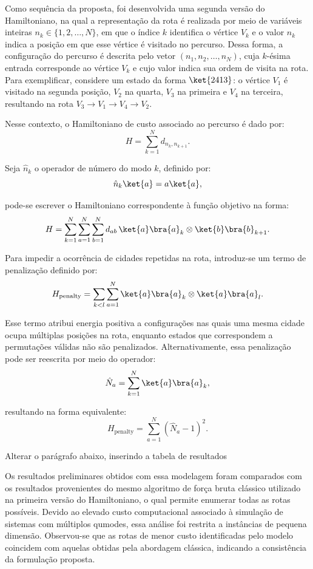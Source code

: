     Como sequência da proposta, foi desenvolvida uma segunda versão do Hamiltoniano, na qual a representação da rota é realizada por meio de variáveis inteiras $n_k \in \{1,2,\dots,N\}$, em que o índice $k$ identifica o vértice $V_k$ e o valor $n_k$ indica a posição em que esse vértice é visitado no percurso. Dessa forma, a configuração do percurso é descrita pelo vetor $(n_1, n_2, \dots, n_N)$, cuja $k$-ésima entrada corresponde ao vértice $V_k$ e cujo valor indica sua ordem de visita na rota. Para exemplificar, considere um estado da forma $\ket{2413}$: o vértice $V_1$ é visitado na segunda posição, $V_2$ na quarta, $V_3$ na primeira e $V_4$ na terceira, resultando na rota $V_3\rightarrow V_1\rightarrow V_4\rightarrow V_2$.

    Nesse contexto, o Hamiltoniano de custo associado ao percurso é dado por:
    $$
    H = \sum_{k=1}^N d_{n_k, n_{k+1}}.
    $$

    Seja $\hat{n}_k$ o operador de número do modo $k$, definido por:
    $$
    \hat{n}_k\ket{a} = a\ket{a},
    $$

    \noindent pode-se escrever o Hamiltoniano correspondente à função objetivo na forma:
    $$
    H = \sum_{k=1}^N \sum_{a=1}^N \sum_{b=1}^N d_{ab}\, \ket{a}\bra{a}_k \otimes \ket{b}\bra{b}_{k+1}.
    $$

    Para impedir a ocorrência de cidades repetidas na rota, introduz-se um termo de penalização definido por:
    $$
    H_{\text{penalty}} = \sum_{k<l} \sum_{a=1}^N \ket{a}\bra{a}_k \otimes \ket{a}\bra{a}_l.
    $$

    Esse termo atribui energia positiva a configurações nas quais uma mesma cidade ocupa múltiplas posições na rota, enquanto estados que correspondem a permutações válidas não são penalizados. Alternativamente, essa penalização pode ser reescrita por meio do operador:
    $$
    \hat{N}_a = \sum_{k=1}^N \ket{a}\bra{a}_k,
    $$

    \noindent resultando na forma equivalente:
    $$
    H_{\text{penalty}} = \sum_{a=1}^N \left(\hat{N}_a - 1 \right)^2.
    $$

    {\color{red} Alterar o parágrafo abaixo, inserindo a tabela de resultados}

    Os resultados preliminares obtidos com essa modelagem foram comparados com os resultados provenientes do mesmo algoritmo de força bruta clássico utilizado na primeira versão do Hamiltoniano, o qual permite enumerar todas as rotas possíveis. Devido ao elevado custo computacional associado à simulação de sistemas com múltiplos qumodes, essa análise foi restrita a instâncias de pequena dimensão. Observou-se que as rotas de menor custo identificadas pelo modelo coincidem com aquelas obtidas pela abordagem clássica, indicando a consistência da formulação proposta.

